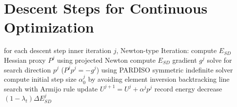 \section{Descent Steps for Continuous Optimization}

for each descent step inner iteration $j$, Newton-type Iteration:
compute $E_{SD}$ Hessian proxy $P^j$ using projected Newton
compute $E_{SD}$ gradient $g^j$
solve for search direction $p^j$ ($P^j p^j = -g^j$) using PARDISO symmetric indefinite solver
compute initial step size $\alpha^j_0$ by avoiding element inversion
backtracking line search with Armijo rule
update $U^{j+1} = U^j + \alpha^j p^j$
record energy decrease $(1-\lambda_t)\Delta E_{SD}^j$
